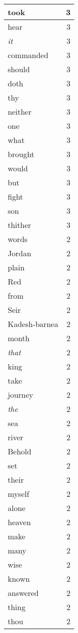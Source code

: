 \begin{center}
\begin{longtable}{l|r}
took & 3 \\ \hline
hear & 3 \\ \hline
\emph{it} & 3 \\ \hline
commanded & 3 \\ \hline
should & 3 \\ \hline
doth & 3 \\ \hline
thy & 3 \\ \hline
neither & 3 \\ \hline
one & 3 \\ \hline
what & 3 \\ \hline
brought & 3 \\ \hline
would & 3 \\ \hline
but & 3 \\ \hline
fight & 3 \\ \hline
son & 3 \\ \hline
thither & 3 \\ \hline
words & 2 \\ \hline
Jordan & 2 \\ \hline
plain & 2 \\ \hline
Red & 2 \\ \hline
from & 2 \\ \hline
Seir & 2 \\ \hline
Kadesh-barnea & 2 \\ \hline
month & 2 \\ \hline
\emph{that} & 2 \\ \hline
king & 2 \\ \hline
take & 2 \\ \hline
journey & 2 \\ \hline
\emph{the} & 2 \\ \hline
sea & 2 \\ \hline
river & 2 \\ \hline
Behold & 2 \\ \hline
set & 2 \\ \hline
their & 2 \\ \hline
myself & 2 \\ \hline
alone & 2 \\ \hline
heaven & 2 \\ \hline
make & 2 \\ \hline
many & 2 \\ \hline
wise & 2 \\ \hline
known & 2 \\ \hline
answered & 2 \\ \hline
thing & 2 \\ \hline
thou & 2 \\ \hline

\end{longtable}
\end{center}
